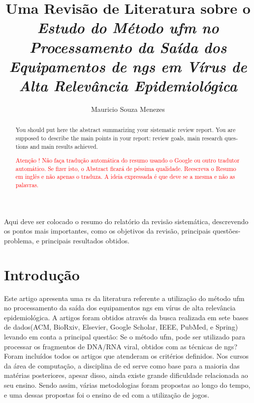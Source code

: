 \documentclass[12pt]{article}
\title{Uma Revisão de Literatura sobre o \textit{Estudo do Método \gls{ufm} no Processamento da Saída dos Equipamentos de \gls{ngs} em Vírus de Alta Relevância Epidemiológica}}
\author{Mauricio Souza Menezes\\}
\begin{document}

\maketitle

\begin{resumo}
    Aqui deve ser colocado o resumo do relatório da revisão sistemática, descrevendo os pontos mais importantes, como os objetivos da revisão, principais questões-problema, e principais resultados obtidos.
\end{resumo}


\begin{abstract}
    \begin{otherlanguage}{english}
        You should put here the abstract summarizing your sistematic review report. You are supposed to describe the main points in your report: review goals, main research questions and main results achieved.
    \end{otherlanguage} \textcolor{red}{Atenção ! Não faça tradução automática do resumo usando o Google ou outro tradutor automático. Se fizer isto, o Abstract ficará de péssima qualidade. Reescreva o Resumo em inglês e não apenas o traduza. A ideia expressada é que deve se a mesma e não as palavras.}
\end{abstract}


\section{Introdução}

Este artigo apresenta uma \gls{rs} da literatura referente a utilização do método \gls{ufm} no processamento da saída dos equipamentos \gls{ngs} em vírus de alta relevância epidemiológica. A artigos foram obtidos através da busca realizada em sete bases de dados(ACM, BioRxiv, Elsevier, Google Scholar, IEEE, PubMed, e Spring) levando em conta a principal questão: Se o método \gls{ufm}, pode ser utilizado para processar os fragmentos de DNA/RNA viral, obtidos com as técnicas de \gls{ngs}? Foram incluídos todos os artigos que atenderam os critérios definidos.
Nos cursos da área de computação, a disciplina de \gls{ed} serve como base para a maioria das matérias posteriores, apesar disso, ainda existe grande dificuldade relacionada ao seu ensino. Sendo assim, várias metodologias foram propostas ao longo do tempo, e uma dessas propostas foi o ensino de \gls{ed} com a utilização de jogos.
\end{document}
